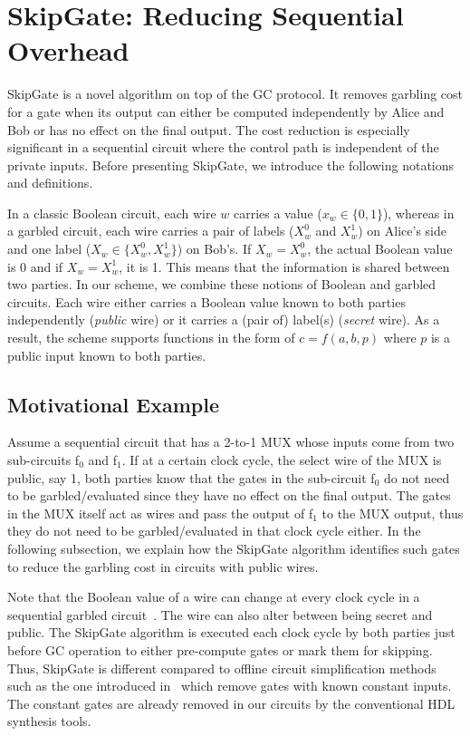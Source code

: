 \chapter{{SkipGate}: Reducing Sequential Overhead}\label{chap:skipgate}
SkipGate is a novel algorithm on top of the GC protocol.
It removes garbling cost for a gate when its output can either be computed independently by Alice and Bob or has no effect on the final output.
The cost reduction is especially significant in a sequential circuit where the control path is independent of the private inputs.
Before presenting SkipGate, we introduce the following notations and definitions.

In a classic Boolean circuit, each wire $w$ carries a value ($x_w\in\{0, 1\}$), whereas in a garbled circuit, each wire carries a pair of labels ($X_w^{0}$ and $X_w^{1}$) on Alice's side and one label ($X_w \in \{X_w^{0}, X_w^{1}\}$) on Bob's.
If $X_w = X_w^{0}$, the actual Boolean value is 0 and if $X_w = X_w^{1}$, it is 1.
This means that the information is shared between two parties.
In our scheme, we combine these notions of Boolean and garbled circuits.
Each wire either carries a Boolean value known to both parties independently (\textit{public} wire) or it carries a (pair of) label(s) (\textit{secret} wire).
As a result, the scheme supports functions in the form of $c = f(a, b, p)$ where $p$ is a public input known to both parties.

\section{Motivational Example}
Assume a sequential circuit that has a 2-to-1 MUX whose inputs come from two sub-circuits f$_0$ and f$_1$.
If at a certain clock cycle, the select wire of the MUX is public, say 1, both parties know that the gates in the sub-circuit f$_0$ do not need to be garbled/evaluated since they have no effect on the final output.
The gates in the MUX itself act as wires and pass the output of f$_1$ to the MUX output, thus they do not need to be garbled/evaluated in that clock cycle either.
In the following subsection, we explain how the SkipGate algorithm identifies such gates to reduce the garbling cost in circuits with public wires.

Note that the Boolean value of a wire can change at every clock cycle in a sequential garbled circuit~\cite{songhori2015tinygarble}.
The wire can also alter between being secret and public.
The SkipGate algorithm is executed each clock cycle by both parties just before GC operation to either pre-compute gates or mark them for skipping.
Thus, SkipGate is different compared to offline circuit simplification methods such as the one introduced in~\cite{pinkas2009secure} which remove gates with known constant inputs.
The constant gates are already removed in our circuits by the conventional HDL synthesis tools.

